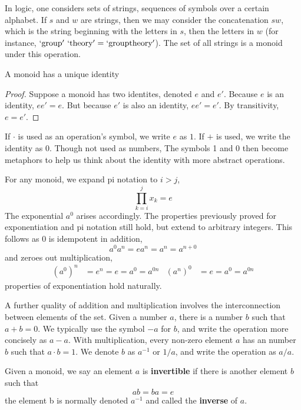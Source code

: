 \begin{example}
    In logic, one considers sets of strings, sequences of symbols over a certain alphabet. If $s$ and $w$ are strings, then we may consider the concatenation $sw$, which is the string beginning with the letters in $s$, then the letters in $w$ (for instance, $\mathrm{`group'}\ \mathrm{`theory'} = \mathrm{`grouptheory'}$). The set of all strings is a monoid under this operation.
\end{example}

\begin{lemma} A monoid has a unique identity \end{lemma}
\begin{proof}
    Suppose a monoid has two identites, denoted $e$ and $e'$. Because $e$ is an identity, $ee' = e$. But because $e'$ is also an identity, $ee' = e'$. By transitivity, $e = e'$.
\end{proof}

If $\cdotp$ is used as an operation's symbol, we write $e$ as $1$. If $+$ is used, we write the identity as $0$. Though not used as numbers, The symbols 1 and 0 then become metaphors to help us think about the identity with more abstract operations.

For any monoid, we expand pi notation to $i > j$,
%
\[ \prod_{k = i}^j x_k = e \]
%
The exponential $a^0$ arises accordingly. The properties previously proved for exponentiation and pi notation still hold, but extend to arbitrary integers. This follows as $0$ is idempotent in addition,
%
\[a^0 a^n = e a^n = a^n = a^{n+0}\]
%
and zeroes out multiplication,
%
\begin{align*} (a^0)^n &= e^n = e = a^0 = a^{0n} & (a^n)^0 &= e = a^0 = a^{0n} \end{align*}
%
properties of exponentiation hold naturally.

A further quality of addition and multiplication involves the interconnection between elements of the set. Given a number $a$, there is a number $b$ such that $a + b = 0$. We typically use the symbol $-a$ for $b$, and write the operation more concisely as $a - a$. With multiplication, every non-zero element $a$ has an number $b$ such that $a \cdot b = 1$. We denote $b$ as $a^{-1}$ or $1/a$, and write the operation as $a/a$.

\begin{definition}
    Given a monoid, we say an element $a$ is {\bf invertible} if there is another element $b$ such that
    \[ ab = ba = e \]
    the element b is normally denoted $a^{-1}$ and called the {\bf inverse} of $a$.
\end{definition}

